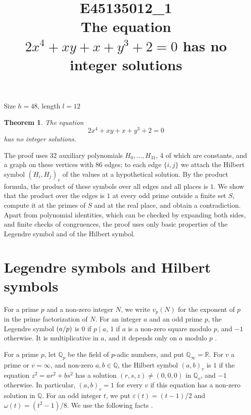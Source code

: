 \documentclass[11pt]{article}
\title{\textbf{E45135012\_1}\\[4pt] {\Large The equation $2x^{4}+xy+x+y^{3}+2=0$ has no integer solutions}}
\author{}
\date{}
\newtheorem{theorem}{Theorem}
\newcommand{\Q}{\mathbb{Q}}
\newcommand{\leg}[2]{\mathchoice{\biggl(\dfrac{#1}{#2}\biggr)}{(#1/#2)}{(#1/#2)}{(#1/#2)}}
\begin{document}
\maketitle
\vspace{-8ex}
\begin{center}
Size $h=48$, length $l=12$
\end{center}

\begin{theorem}\label{thm:main}
The equation
\begin{equation}\label{eq:main}
2x^{4}+xy+x+y^{3}+2=0
\end{equation}
has no integer solutions.
\end{theorem}

The proof uses 32 auxiliary polynomials $H_0,\dots,H_{31}$, 4 of which are constants, and a graph on these vertices with 86 edges; to each edge $\{i,j\}$ we attach the Hilbert symbol $(H_i,H_j)_v$ of the values at a hypothetical solution. By the product formula, the product of these symbols over all edges and all places is $1$. We show that the product over the edges is $1$ at every odd prime outside a finite set $S$, compute it at the primes of $S$ and at the real place, and obtain a contradiction. Apart from polynomial identities, which can be checked by expanding both sides, and finite checks of congruences, the proof uses only basic properties of the Legendre symbol and of the Hilbert symbol.

\section{Legendre symbols and Hilbert symbols}

For a prime $p$ and a non-zero integer $N$, we write $v_p(N)$ for the exponent of $p$ in the prime factorization of $N$. For an integer $a$ and an odd prime $p$, the Legendre symbol $\leg{a}{p}$ is $0$ if $p\mid a$, $1$ if $a$ is a non-zero square modulo $p$, and $-1$ otherwise. It is multiplicative in $a$, and it depends only on $a$ modulo $p$ \cite[Chapter~5]{IR}.

For a prime $p$, let $\Q_p$ be the field of $p$-adic numbers, and put $\Q_\infty=\mathbb R$. For $v$ a prime or $v=\infty$, and non-zero $a,b\in\Q$, the Hilbert symbol $(a,b)_v$ is $1$ if the equation $z^2=ar^2+bs^2$ has a solution $(r,s,z)\neq(0,0,0)$ in $\Q_v$, and $-1$ otherwise. In particular, $(a,b)_v=1$ for every $v$ if this equation has a non-zero solution in $\Q$. For an odd integer $t$, we put $\varepsilon(t)=(t-1)/2$ and $\omega(t)=(t^2-1)/8$. We use the following facts \cite[Chapter~III, Proposition~2 and Theorems~1 and~3]{Se}.
\end{document}

